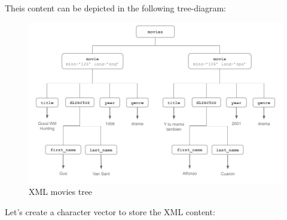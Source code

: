 \documentclass[
]{book}
\begin{document}
Theis content can be depicted in the following tree-diagram:

\begin{figure}

{\centering \includegraphics[width=0.85\linewidth]{images/xml/xml-movies-tree1} 

}

\caption{XML movies tree}\label{fig:unnamed-chunk-25}
\end{figure}

Let's create a character vector to store the XML content:
\end{document}
